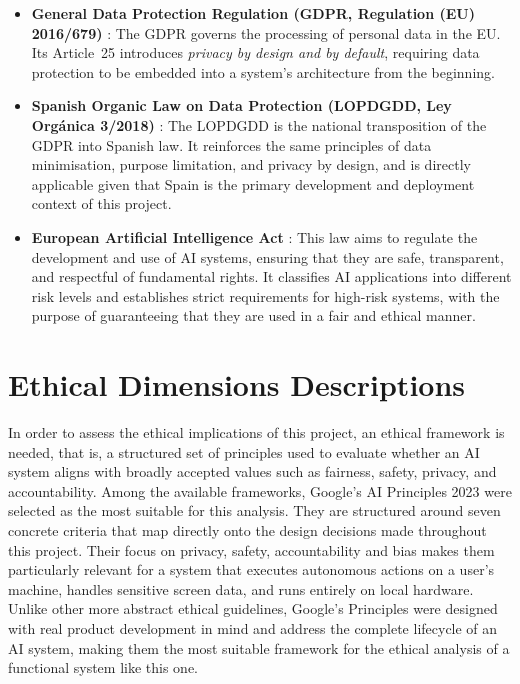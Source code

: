 \begin{itemize}
    \item \textbf{General Data Protection Regulation (GDPR, Regulation (EU) 2016/679)}
    \cite{gdpr}: The GDPR governs the processing of personal data in the EU. Its
    Article~25 introduces \textit{privacy by design and by default}, requiring data
    protection to be embedded into a system's architecture from the beginning.
    \item \textbf{Spanish Organic Law on Data Protection (LOPDGDD, Ley Orgánica
    3/2018)} \cite{lopdgdd}: The LOPDGDD is the national transposition of the GDPR
    into Spanish law. It reinforces the same principles of data minimisation, purpose
    limitation, and privacy by design, and is directly applicable given that Spain is
    the primary development and deployment context of this project.

    \item \textbf{European Artificial Intelligence Act} \cite{ai_act}: This law aims
    to regulate the development and use of AI systems, ensuring that they are safe,
    transparent, and respectful of fundamental rights. It classifies AI applications
    into different risk levels and establishes strict requirements for high-risk
    systems, with the purpose of guaranteeing that they are used in a fair and
    ethical manner.
\end{itemize}

\section{Ethical Dimensions Descriptions}
\label{sec:ethical_dimensions}

In order to assess the ethical implications of this project, an ethical
framework is needed, that is, a structured set of principles used to evaluate
whether an AI system aligns with broadly accepted values such as fairness,
safety, privacy, and accountability. Among the available frameworks, Google's AI
Principles 2023 \cite{google_principles} were selected as the most suitable for this
analysis. They are structured around seven concrete criteria that map directly
onto the design decisions made throughout this project. Their focus on privacy,
safety, accountability and bias makes them particularly relevant for a system
that executes autonomous actions on a user's machine, handles sensitive screen
data, and runs entirely on local hardware. Unlike other more abstract ethical
guidelines, Google's Principles were designed with real product development in
mind and address the complete lifecycle of an AI system, making them the most
suitable framework for the ethical analysis of a functional system like this one.

